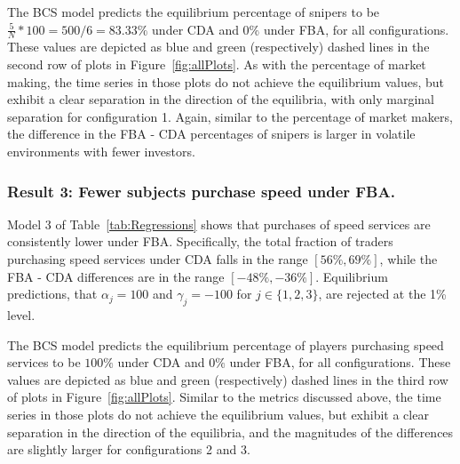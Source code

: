 \documentclass[12pt]{article}
\begin{document}
The BCS model predicts the equilibrium percentage of snipers to be $\frac{5}{N}*100 = 500/6 = 83.33\%$ under CDA and $0\%$ under FBA, for all configurations. These values are depicted as blue and green (respectively) dashed lines in the second row of plots in Figure~\ref{fig:allPlots}. As with the percentage of market making, the time series in those plots do not achieve the equilibrium values, but exhibit a clear separation in the direction of the equilibria, with only marginal separation for configuration 1. Again, similar to the percentage of market makers, the difference in the FBA - CDA percentages of snipers is larger in volatile environments with fewer investors.

\subsubsection*{Result 3: Fewer subjects purchase speed under FBA.}
Model 3 of Table~\ref{tab:Regressions} shows that purchases of speed services are consistently lower under FBA. Specifically, the total fraction of traders purchasing speed services under CDA falls in the range $[56\%,69\%]$, while the FBA - CDA differences are in the range $[-48\%, -36\%]$. Equilibrium predictions, that $\alpha_j=100$ and $\gamma_j=-100$ for $j\in\{1,2,3\}$, are rejected at the 1\% level.

The BCS model predicts the equilibrium percentage of players purchasing speed services to be $100\%$ under CDA and $0\%$ under FBA, for all configurations. These values are depicted as blue and green (respectively) dashed lines in the third row of plots in Figure~\ref{fig:allPlots}. Similar to the metrics discussed above, the time series in those plots do not achieve the equilibrium values, but exhibit a clear separation in the direction of the equilibria, and the magnitudes of the differences are slightly larger for configurations 2 and 3.
\end{document}
